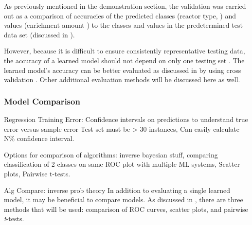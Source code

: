 As previously mentioned in the  demonstration section, the
validation was carried out as a comparison of accuracies of the predicted
classes (reactor type, ) and values
(enrichment amount ) to the classes and values in the
predetermined test data set (discussed in ). 

However, because it is difficult to ensure consistently representative testing
data, the accuracy of a learned model should not depend on only one testing set
. The learned model's accuracy can be
better evaluated as discussed in  by
using cross validation .
Other additional evaluation methods will be discussed here as well.  

\subsubsection{Model Comparison}
\label{sec:algcompare}

Regression Training Error: Confidence intervals on predictions to understand
true error versus sample error Test set must be > 30 instances, Can easily
calculate N\% confidence interval.

Options for comparison of algorithms: inverse bayesian stuff, comparing
classification of 2 classes on same ROC plot with multiple ML systems, Scatter
plots, Pairwise t-tests.

Alg Compare: inverse prob theory
In addition to evaluating a single learned model, it may be beneficial to
compare models. As discussed in , there
are three methods that will be used: comparison of \gls{ROC} curves, scatter
plots, and pairwise \textit{t}-tests.

